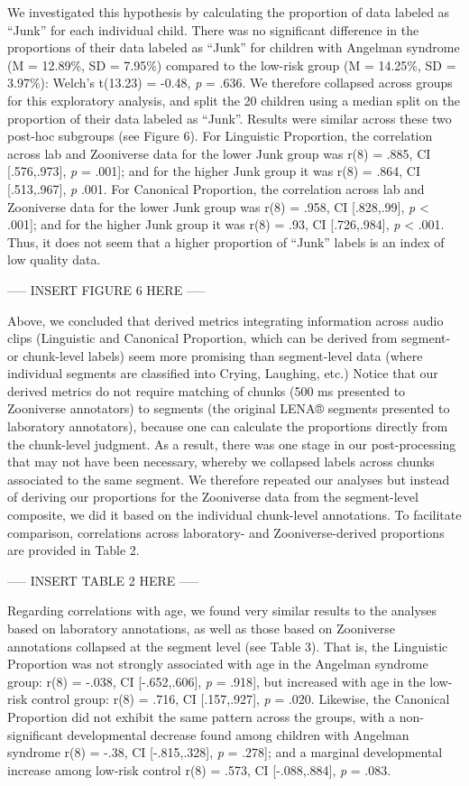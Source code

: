 \documentclass[english,,man]{apa6}
\begin{document}
We investigated this hypothesis by calculating the proportion of data labeled as \enquote{Junk} for each individual child. There was no significant difference in the proportions of their data labeled as \enquote{Junk} for children with Angelman syndrome (M = 12.89\%, SD = 7.95\%) compared to the low-risk group (M = 14.25\%, SD = 3.97\%): Welch's t(13.23) = -0.48, \emph{p} = .636. We therefore collapsed across groups for this exploratory analysis, and split the 20 children using a median split on the proportion of their data labeled as \enquote{Junk}. Results were similar across these two post-hoc subgroups (see Figure 6). For Linguistic Proportion, the correlation across lab and Zooniverse data for the lower Junk group was r(8) = .885, CI {[}.576,.973{]}, \emph{p} = .001{]}; and for the higher Junk group it was r(8) = .864, CI {[}.513,.967{]}, \emph{p} .001. For Canonical Proportion, the correlation across lab and Zooniverse data for the lower Junk group was r(8) = .958, CI {[}.828,.99{]}, \emph{p} \textless{} .001{]}; and for the higher Junk group it was r(8) = .93, CI {[}.726,.984{]}, \emph{p} \textless{} .001. Thus, it does not seem that a higher proportion of \enquote{Junk} labels is an index of low quality data.

----- INSERT FIGURE 6 HERE -----

Above, we concluded that derived metrics integrating information across audio clips (Linguistic and Canonical Proportion, which can be derived from segment- or chunk-level labels) seem more promising than segment-level data (where individual segments are classified into Crying, Laughing, etc.) Notice that our derived metrics do not require matching of chunks (500 ms presented to Zooniverse annotators) to segments (the original LENA® segments presented to laboratory annotators), because one can calculate the proportions directly from the chunk-level judgment. As a result, there was one stage in our post-processing that may not have been necessary, whereby we collapsed labels across chunks associated to the same segment. We therefore repeated our analyses but instead of deriving our proportions for the Zooniverse data from the segment-level composite, we did it based on the individual chunk-level annotations. To facilitate comparison, correlations across laboratory- and Zooniverse-derived proportions are provided in Table 2.

----- INSERT TABLE 2 HERE -----

Regarding correlations with age, we found very similar results to the analyses based on laboratory annotations, as well as those based on Zooniverse annotations collapsed at the segment level (see Table 3). That is, the Linguistic Proportion was not strongly associated with age in the Angelman syndrome group: r(8) = -.038, CI {[}-.652,.606{]}, \emph{p} = .918{]}, but increased with age in the low-risk control group: r(8) = .716, CI {[}.157,.927{]}, \emph{p} = .020. Likewise, the Canonical Proportion did not exhibit the same pattern across the groups, with a non-significant developmental decrease found among children with Angelman syndrome r(8) = -.38, CI {[}-.815,.328{]}, \emph{p} = .278{]}; and a marginal developmental increase among low-risk control r(8) = .573, CI {[}-.088,.884{]}, \emph{p} = .083.
\end{document}
